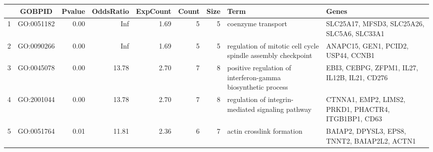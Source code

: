 \begin{table}[ht]
\centering
\begin{tabular}{l|c|r|r|r|r|r|p{3cm}|p{3cm}|}
  \hline
 & GOBPID & Pvalue & OddsRatio & ExpCount & Count & Size & Term & Genes \\ 
  \hline
1 & GO:0051182 & 0.00 & Inf & 1.69 &   5 &   5 & coenzyme transport & SLC25A17, MFSD3, SLC25A26, SLC5A6, SLC33A1 \\ 
  2 & GO:0090266 & 0.00 & Inf & 1.69 &   5 &   5 & regulation of mitotic cell cycle spindle assembly checkpoint & ANAPC15, GEN1, PCID2, USP44, CCNB1 \\ 
  3 & GO:0045078 & 0.00 & 13.78 & 2.70 &   7 &   8 & positive regulation of interferon-gamma biosynthetic process & EBI3, CEBPG, ZFPM1, IL27, IL12B, IL21, CD276 \\ 
  4 & GO:2001044 & 0.00 & 13.78 & 2.70 &   7 &   8 & regulation of integrin-mediated signaling pathway & CTNNA1, EMP2, LIMS2, PRKD1, PHACTR4, ITGB1BP1, CD63 \\ 
  5 & GO:0051764 & 0.01 & 11.81 & 2.36 &   6 &   7 & actin crosslink formation & BAIAP2, DPYSL3, EPS8, TNNT2, BAIAP2L2, ACTN1 \\ 
   \hline
\end{tabular}
\end{table}

